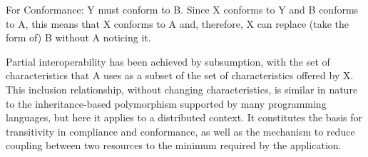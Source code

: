 For Conformance: Y must conform to B. Since X conforms to Y and B conforms to A, this means that X conforms to
A and, therefore, X can replace (take the form of) B without A noticing it. 

Partial interoperability has been achieved by subsumption, with the set of characteristics that A uses as a subset of the set of characteristics offered by X. This inclusion relationship, without changing characteristics, is similar in nature to the inheritance-based polymorphism supported by many programming languages, but here it applies to a distributed context. It constitutes the basis for transitivity in compliance and conformance, as well as the mechanism to reduce coupling between two resources to the minimum required by the application. 





